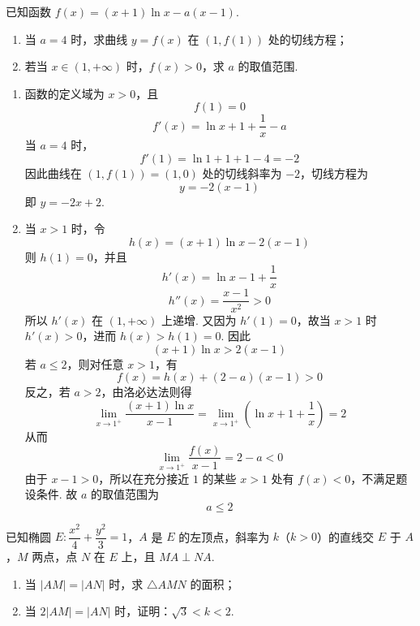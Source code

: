 \begin{problem}
已知函数 \(f(x)=(x+1)\ln x-a(x-1)\).
\begin{enumerate}
\item 当 \(a=4\) 时，求曲线 \(y=f(x)\) 在 \((1,f(1))\) 处的切线方程；
\item 若当 \(x\in(1,+\infty)\) 时，\(f(x)>0\)，求 \(a\) 的取值范围.
\end{enumerate}
\end{problem}

\begin{solution}
\begin{enumerate}
\item 函数的定义域为 \(x>0\)，且
\[
f(1)=0
\]
\[
f'(x)=\ln x+1+\dfrac1x-a
\]
当 \(a=4\) 时，
\[
f'(1)=\ln1+1+1-4=-2
\]
因此曲线在 \((1,f(1))=(1,0)\) 处的切线斜率为 \(-2\)，切线方程为
\[
y=-2(x-1)
\]
即 \(y=-2x+2\).

\item 当 \(x>1\) 时，令
\[
h(x)=(x+1)\ln x-2(x-1)
\]
则 \(h(1)=0\)，并且
\[
h'(x)=\ln x-1+\dfrac1x
\]
\[
h''(x)=\dfrac{x-1}{x^2}>0
\]
所以 \(h'(x)\) 在 \((1,+\infty)\) 上递增. 又因为 \(h'(1)=0\)，故当 \(x>1\) 时 \(h'(x)>0\)，进而 \(h(x)>h(1)=0\). 因此
\[
(x+1)\ln x>2(x-1)
\]
若 \(a\leq2\)，则对任意 \(x>1\)，有
\[
f(x)=h(x)+(2-a)(x-1)>0
\]
反之，若 \(a>2\)，由洛必达法则得
\[
\lim_{x\to1^+}\dfrac{(x+1)\ln x}{x-1}=\lim_{x\to1^+}\left(\ln x+1+\dfrac1x\right)=2
\]
从而
\[
\lim_{x\to1^+}\dfrac{f(x)}{x-1}=2-a<0
\]
由于 \(x-1>0\)，所以在充分接近 \(1\) 的某些 \(x>1\) 处有 \(f(x)<0\)，不满足题设条件. 故 \(a\) 的取值范围为
\[
a\leq2
\]
\end{enumerate}
\end{solution}


\begin{problem}
已知椭圆 \(E:\dfrac{x^2}{4}+\dfrac{y^2}{3}=1\)，\(A\) 是 \(E\) 的左顶点，斜率为 \(k\)（\(k>0\)）的直线交 \(E\) 于 \(A\)，\(M\) 两点，点 \(N\) 在 \(E\) 上，且 \(MA\perp NA\).
\begin{enumerate}
\item 当 \(\lvert AM\rvert=\lvert AN\rvert\) 时，求 \(\triangle AMN\) 的面积；
\item 当 \(2\lvert AM\rvert=\lvert AN\rvert\) 时，证明：\(\sqrt3<k<2\).
\end{enumerate}
\end{problem}

